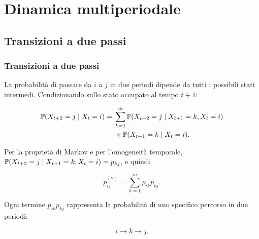 

\section{Dinamica multiperiodale}

\subsection{Transizioni a due passi}%

\begin{frame}%
%

\frametitle{Transizioni a due passi}%
%

%


La probabilit\`{a} di passare da $i$ a $j$ in due periodi dipende da tutti i
possibili stati intermedi. Condizionando sullo stato occupato al tempo $t+1$:%

\[
\begin{aligned}
\mathbb{P}(X_{t+2}=j\mid X_{t}=i) = {} & \sum_{k=1}^{m} \mathbb{P}(X_{t+2}=j\mid X_{t+1}=k,X_{t}=i) \\
& \times \mathbb{P}(X_{t+1}=k\mid X_{t}=i).
\end{aligned}
\]


\medskip

Per la propriet\`{a} di Markov e per l'omogeneit\`{a} temporale,
$\mathbb{P}(X_{t+2}=j\mid X_{t+1}=k,X_{t}=i)=p_{kj}$, e quindi%

\[
p_{ij}^{(2)} = \sum_{k=1}^{m}p_{ik}p_{kj}.
\]


\medskip

Ogni termine $p_{ik}p_{kj}$ rappresenta la probabilit\`{a} di uno specifico
percorso in due periodi:%

\[
i\longrightarrow k\longrightarrow j.
\]
%

\transboxout
\end{frame}%




